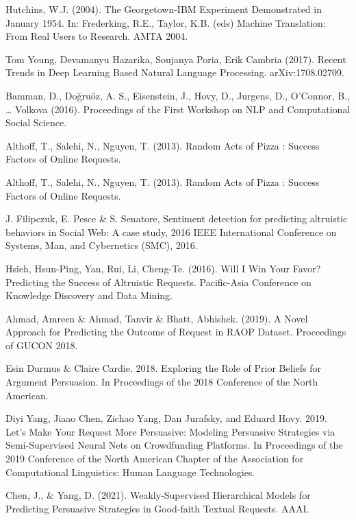 \documentclass[runningheads]{llncs}
\begin{document}

\begin{thebibliography}{00}
Hutchins, W.J. (2004). The Georgetown-IBM Experiment Demonstrated in January 1954. In: Frederking, R.E., Taylor, K.B. (eds) Machine Translation: From Real Users to Research. AMTA 2004.

Tom Young, Devamanyu Hazarika, Soujanya Poria, Erik Cambria (2017). Recent Trends in Deep Learning Based Natural Language Processing. arXiv:1708.02709.

Bamman, D., Doğruöz, A. S., Eisenstein, J., Hovy, D., Jurgens, D., O’Connor, B., … Volkova (2016). Proceedings of the First Workshop on NLP and Computational Social Science.

Althoff, T., Salehi, N., Nguyen, T. (2013). Random Acts of Pizza : Success Factors of Online Requests.

Althoff, T., Salehi, N., Nguyen, T. (2013). Random Acts of Pizza : Success Factors of Online Requests.

J. Filipczuk, E. Pesce \& S. Senatore, Sentiment detection for predicting altruistic behaviors in Social Web: A case study, 2016 IEEE International Conference on Systems, Man, and Cybernetics (SMC), 2016.

Hsieh, Hsun-Ping, Yan, Rui, Li, Cheng-Te. (2016). Will I Win Your Favor? Predicting the Success of Altruistic Requests. Pacific-Asia Conference on Knowledge Discovery and Data Mining.

Ahmad, Amreen \& Ahmad, Tanvir & Bhatt, Abhishek. (2019). A Novel Approach for Predicting the Outcome of Request in RAOP Dataset. Proceedings of GUCON 2018.

Esin Durmus \& Claire Cardie. 2018. Exploring the Role of Prior Beliefs for Argument Persuasion. In Proceedings of the 2018 Conference of the North American.

Diyi Yang, Jiaao Chen, Zichao Yang, Dan Jurafsky, and Eduard Hovy. 2019. Let’s Make Your Request More Persuasive: Modeling Persuasive Strategies via Semi-Supervised Neural Nets on Crowdfunding Platforms. In Proceedings of the 2019 Conference of the North American Chapter of the Association for Computational Linguistics: Human Language Technologies.

Chen, J., \& Yang, D. (2021). Weakly-Supervised Hierarchical Models for Predicting Persuasive Strategies in Good-faith Textual Requests. AAAI.


\end{thebibliography}
\end{document}

